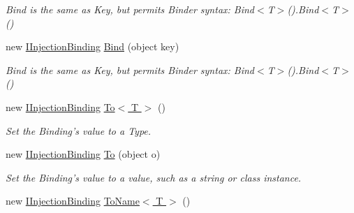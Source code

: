 \begin{DoxyCompactItemize}
\begin{DoxyCompactList}\small\item\em Bind is the same as Key, but permits Binder syntax\-: {\ttfamily Bind$<$T$>$().Bind$<$T$>$()} \end{DoxyCompactList}\item 
\hypertarget{classstrange_1_1extensions_1_1injector_1_1impl_1_1_injection_binding_ab4624a41fa035cab5fea7e983e5b11a5}{new \hyperlink{interfacestrange_1_1extensions_1_1injector_1_1api_1_1_i_injection_binding}{I\-Injection\-Binding} \hyperlink{classstrange_1_1extensions_1_1injector_1_1impl_1_1_injection_binding_ab4624a41fa035cab5fea7e983e5b11a5}{Bind} (object key)}\label{classstrange_1_1extensions_1_1injector_1_1impl_1_1_injection_binding_ab4624a41fa035cab5fea7e983e5b11a5}

\begin{DoxyCompactList}\small\item\em Bind is the same as Key, but permits Binder syntax\-: {\ttfamily Bind$<$T$>$().Bind$<$T$>$()} \end{DoxyCompactList}\item 
\hypertarget{classstrange_1_1extensions_1_1injector_1_1impl_1_1_injection_binding_a5c1d315334796d4ec9991504634e6598}{new \hyperlink{interfacestrange_1_1extensions_1_1injector_1_1api_1_1_i_injection_binding}{I\-Injection\-Binding} \hyperlink{classstrange_1_1extensions_1_1injector_1_1impl_1_1_injection_binding_a5c1d315334796d4ec9991504634e6598}{To$<$ T $>$} ()}\label{classstrange_1_1extensions_1_1injector_1_1impl_1_1_injection_binding_a5c1d315334796d4ec9991504634e6598}

\begin{DoxyCompactList}\small\item\em Set the Binding's value to a Type. \end{DoxyCompactList}\item 
\hypertarget{classstrange_1_1extensions_1_1injector_1_1impl_1_1_injection_binding_a010293da2e6b1fda3ad01f384a8c006f}{new \hyperlink{interfacestrange_1_1extensions_1_1injector_1_1api_1_1_i_injection_binding}{I\-Injection\-Binding} \hyperlink{classstrange_1_1extensions_1_1injector_1_1impl_1_1_injection_binding_a010293da2e6b1fda3ad01f384a8c006f}{To} (object o)}\label{classstrange_1_1extensions_1_1injector_1_1impl_1_1_injection_binding_a010293da2e6b1fda3ad01f384a8c006f}

\begin{DoxyCompactList}\small\item\em Set the Binding's value to a value, such as a string or class instance. \end{DoxyCompactList}\item 
\hypertarget{classstrange_1_1extensions_1_1injector_1_1impl_1_1_injection_binding_a3c638883ca8c1ac4349300b3922fe68d}{new \hyperlink{interfacestrange_1_1extensions_1_1injector_1_1api_1_1_i_injection_binding}{I\-Injection\-Binding} \hyperlink{classstrange_1_1extensions_1_1injector_1_1impl_1_1_injection_binding_a3c638883ca8c1ac4349300b3922fe68d}{To\-Name$<$ T $>$} ()}\label{classstrange_1_1extensions_1_1injector_1_1impl_1_1_injection_binding_a3c638883ca8c1ac4349300b3922fe68d}


\end{DoxyCompactItemize}
